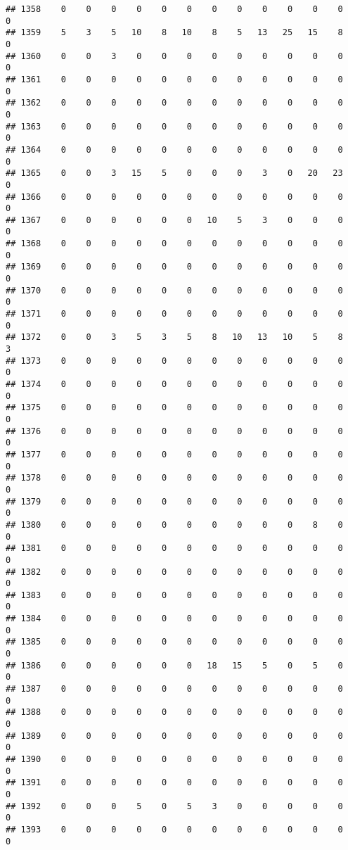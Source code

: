 \documentclass[]{article}
\begin{document}
\begin{verbatim}
## 1358    0    0    0    0    0    0    0    0    0    0    0    0    0
## 1359    5    3    5   10    8   10    8    5   13   25   15    8    0
## 1360    0    0    3    0    0    0    0    0    0    0    0    0    0
## 1361    0    0    0    0    0    0    0    0    0    0    0    0    0
## 1362    0    0    0    0    0    0    0    0    0    0    0    0    0
## 1363    0    0    0    0    0    0    0    0    0    0    0    0    0
## 1364    0    0    0    0    0    0    0    0    0    0    0    0    0
## 1365    0    0    3   15    5    0    0    0    3    0   20   23    0
## 1366    0    0    0    0    0    0    0    0    0    0    0    0    0
## 1367    0    0    0    0    0    0   10    5    3    0    0    0    0
## 1368    0    0    0    0    0    0    0    0    0    0    0    0    0
## 1369    0    0    0    0    0    0    0    0    0    0    0    0    0
## 1370    0    0    0    0    0    0    0    0    0    0    0    0    0
## 1371    0    0    0    0    0    0    0    0    0    0    0    0    0
## 1372    0    0    3    5    3    5    8   10   13   10    5    8    3
## 1373    0    0    0    0    0    0    0    0    0    0    0    0    0
## 1374    0    0    0    0    0    0    0    0    0    0    0    0    0
## 1375    0    0    0    0    0    0    0    0    0    0    0    0    0
## 1376    0    0    0    0    0    0    0    0    0    0    0    0    0
## 1377    0    0    0    0    0    0    0    0    0    0    0    0    0
## 1378    0    0    0    0    0    0    0    0    0    0    0    0    0
## 1379    0    0    0    0    0    0    0    0    0    0    0    0    0
## 1380    0    0    0    0    0    0    0    0    0    0    8    0    0
## 1381    0    0    0    0    0    0    0    0    0    0    0    0    0
## 1382    0    0    0    0    0    0    0    0    0    0    0    0    0
## 1383    0    0    0    0    0    0    0    0    0    0    0    0    0
## 1384    0    0    0    0    0    0    0    0    0    0    0    0    0
## 1385    0    0    0    0    0    0    0    0    0    0    0    0    0
## 1386    0    0    0    0    0    0   18   15    5    0    5    0    0
## 1387    0    0    0    0    0    0    0    0    0    0    0    0    0
## 1388    0    0    0    0    0    0    0    0    0    0    0    0    0
## 1389    0    0    0    0    0    0    0    0    0    0    0    0    0
## 1390    0    0    0    0    0    0    0    0    0    0    0    0    0
## 1391    0    0    0    0    0    0    0    0    0    0    0    0    0
## 1392    0    0    0    5    0    5    3    0    0    0    0    0    0
## 1393    0    0    0    0    0    0    0    0    0    0    0    0    0

\end{verbatim}
\end{document}
